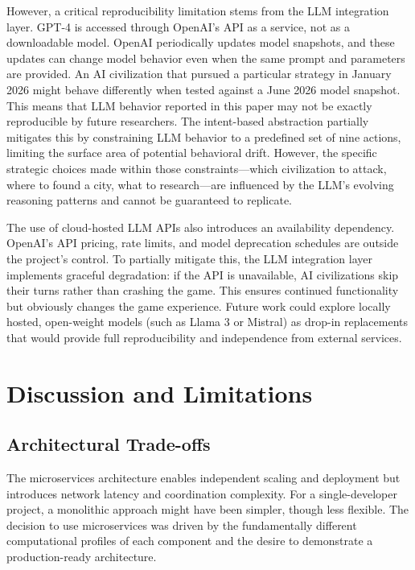 \documentclass[conference]{IEEEtran}
\begin{document}
However, a critical reproducibility limitation stems from the LLM integration layer. GPT-4 is accessed through OpenAI's API as a service, not as a downloadable model. OpenAI periodically updates model snapshots, and these updates can change model behavior even when the same prompt and parameters are provided. An AI civilization that pursued a particular strategy in January 2026 might behave differently when tested against a June 2026 model snapshot. This means that LLM behavior reported in this paper may not be exactly reproducible by future researchers. The intent-based abstraction partially mitigates this by constraining LLM behavior to a predefined set of nine actions, limiting the surface area of potential behavioral drift. However, the specific strategic choices made within those constraints---which civilization to attack, where to found a city, what to research---are influenced by the LLM's evolving reasoning patterns and cannot be guaranteed to replicate.

The use of cloud-hosted LLM APIs also introduces an availability dependency. OpenAI's API pricing, rate limits, and model deprecation schedules are outside the project's control. To partially mitigate this, the LLM integration layer implements graceful degradation: if the API is unavailable, AI civilizations skip their turns rather than crashing the game. This ensures continued functionality but obviously changes the game experience. Future work could explore locally hosted, open-weight models (such as Llama 3 or Mistral) as drop-in replacements that would provide full reproducibility and independence from external services.

\section{Discussion and Limitations}
\label{sec:discussion}

\subsection{Architectural Trade-offs}

The microservices architecture enables independent scaling and deployment but introduces network latency and coordination complexity. For a single-developer project, a monolithic approach might have been simpler, though less flexible. The decision to use microservices was driven by the fundamentally different computational profiles of each component and the desire to demonstrate a production-ready architecture.
\end{document}
